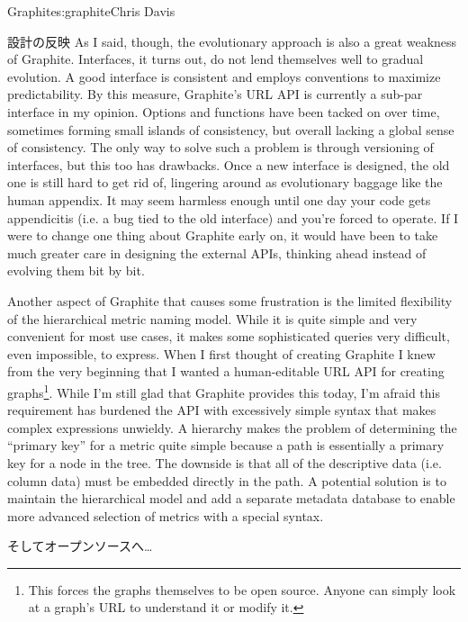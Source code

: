 \begin{aosachapter}{Graphite}{s:graphite}{Chris Davis}
\begin{aosasect1}{設計の反映}
As I said, though, the evolutionary approach is also a great weakness
of Graphite. Interfaces, it turns out, do not lend themselves well to
gradual evolution. A good interface is consistent and employs
conventions to maximize predictability. By this measure, Graphite's
URL API is currently a sub-par interface in my opinion. Options and
functions have been tacked on over time, sometimes forming small
islands of consistency, but overall lacking a global sense of
consistency. The only way to solve such a problem is through
versioning of interfaces, but this too has drawbacks. Once a new
interface is designed, the old one is still hard to get rid of,
lingering around as evolutionary baggage like the human appendix. It
may seem harmless enough until one day your code gets appendicitis
(i.e. a bug tied to the old interface) and you're forced to
operate. If I were to change one thing about Graphite early on, it
would have been to take much greater care in designing the external
APIs, thinking ahead instead of evolving them bit by bit.

Another aspect of Graphite that causes some frustration is the limited
flexibility of the hierarchical metric naming model. While it is quite
simple and very convenient for most use cases, it makes some
sophisticated queries very difficult, even impossible, to
express. When I first thought of creating Graphite I knew from the
very beginning that I wanted a human-editable URL API for creating
graphs\footnote{This forces the graphs themselves to be open
source. Anyone can simply look at a graph's URL to understand it or
modify it.}. While I'm still glad that Graphite provides this today,
I'm afraid this requirement has burdened the API with excessively
simple syntax that makes complex expressions unwieldy.  A hierarchy
makes the problem of determining the ``primary key'' for a metric
quite simple because a path is essentially a primary key for a node in
the tree. The downside is that all of the descriptive data (i.e.
column data) must be embedded directly in the path. A potential
solution is to maintain the hierarchical model and add a separate
metadata database to enable more advanced selection of metrics with a
special syntax.

\end{aosasect1}

\begin{aosasect1}{そしてオープンソースへ…}


\end{aosasect1}
\end{aosachapter}
